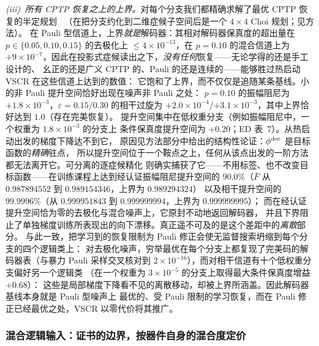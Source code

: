 \documentclass[11pt,a4paper]{article}
\begin{document}
\emph{(iii)~所有 CPTP 恢复之上的上界。}对每个分支我们都精确求解了最优 CPTP 恢复的半定规划
~\cite{reimpell_werner}（在把分支约化到二维症候子空间后是一个 $4\times4$ Choi 规划；见方法）。
在 Pauli 型信道上，上界\emph{就是}解码器：其相对解码器保真度的超出量在
$p\in\{0.05,0.10,0.15\}$ 的去极化上 $\le4\times10^{-13}$，在 $p=0.10$ 的混合信道上为
$+9\times10^{-7}$，因此在投影式症候读出之下，\emph{没有任何}恢复——无论学得的还是手工设计的、
幺正的还是广义 CPTP 的、Pauli 的还是连续的——能够胜过热启动 VSCR 在这些信道上达到的数值：
它饱和了上界，而不仅仅是追随某条基线。小的非 Pauli 提升空间恰好出现在噪声非 Pauli 之处：
$p=0.10$ 的振幅阻尼为 $+1.8\times10^{-3}$，$\varepsilon=0.15/0.30$ 的相干过旋为
$+2.0\times10^{-4}$/$+3.1\times10^{-3}$，其中上界恰好达到 $1.0$（存在完美恢复）。
提升空间集中在低权重分支（例如振幅阻尼中，一个权重为 $1.8\times10^{-3}$ 的分支上
条件保真度提升空间为 $+0.20$；ED 表~7）。从热启动出发的梯度下降达不到它，
原因见方法部分中给出的结构性论证：$\phi^{\rm dec}$ 是目标函数的\emph{精确}驻点，
所以提升空间位于一个鞍点之上，任何从该点出发的一阶方法都无法离开它。可分离的逐症候精化
则确实捕获了它——不用标签、也不改变目标函数——在训练课程上达到经认证振幅阻尼提升空间的
$90.0\%$（$\bar F$ 从 $0.987894552$ 到 $0.989154346$，上界为 $0.989294324$）
以及相干提升空间的 $99.9996\%$（从 $0.999951843$ 到 $0.999999994$，上界为 $0.999999995$）；
而在经认证提升空间恰为零的去极化与混合噪声上，它原封不动地返回解码器，
并且下界阻止了单独梯度训练所表现出的向下漂移。真正遥不可及的是这个差距中的\emph{离散}部分。
与此一致，把学习到的恢复限制为 Pauli 修正会使无监督搜索坍缩到每个分支的四个逻辑类上：
对去极化噪声，穷举最优在每个分支上都复现了完美码的解码器表（与暴力 Pauli 采样交叉核对到
$2\times10^{-16}$），而对相干信道有十个低权重分支偏好另一个逻辑类
（在一个权重为 $3\times10^{-5}$ 的分支上取得最大条件保真度增益 $+0.68$）：
这些是局部梯度下降看不见的离散移动，却被上界所涵盖。因此解码器基线本身就是 Pauli 型噪声上
最优的、受 Pauli 限制的学习恢复，而在 Pauli 修正已经最优之处，VSCR 以零代价将其推广。

\subsubsection*{混合逻辑输入：证书的边界，按器件自身的混合度定价}
\end{document}
